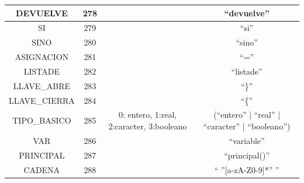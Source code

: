 \documentclass[12pt, spanish]{article}
\begin{document}
\begin{table}[h]
{\begin{tabular}{|c|c|c|c|}
DEVUELVE & 278 &  & ``devuelve'' \\ \hline
SI & 279 &  & ``si'' \\ \hline
SINO & 280 &  & ``sino'' \\ \hline
ASIGNACION & 281 &  & ``='' \\ \hline
LISTADE & 282 &  & ``listade'' \\ \hline
LLAVE\_ABRE & 283 &  & ``\}'' \\ \hline
LLAVE\_CIERRA & 284 &  & ``\{'' \\ \hline
TIPO\_BASICO & 285 & 0: entero, 1:real, 2:caracter, 3:booleano & (``entero'' | ``real'' | ``caracter'' | ``booleano'') \\ \hline
VAR & 286 &  & ``variable'' \\ \hline
PRINCIPAL & 287 &  & ``principal()'' \\ \hline
CADENA & 288 & & `` ''{[}a-zA-Z0-9{]}*'' '' \\ \hline
\end{tabular}%
}
\end{table}
\end{document}
